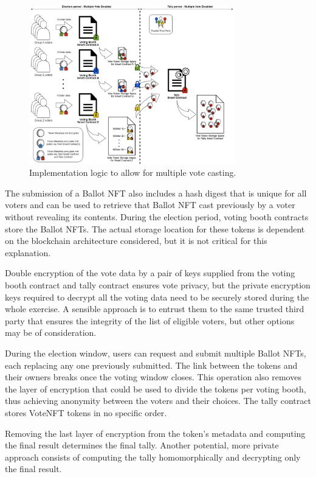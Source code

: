 \documentclass[../main.tex]{subfiles}
\begin{document}
\begin{figure}[htp]
    \centering
    \includegraphics[width=0.8\textwidth]{../Images/MultipleVoteCastingLogic.png}
    \caption{Implementation logic to allow for multiple vote casting.}
    \label{fig:multiple_vote_casting}
\end{figure}


The submission of a Ballot NFT also includes a hash digest that is unique for all voters and can be used to retrieve that Ballot NFT cast previously by a voter without revealing its contents. During the election period, voting booth contracts store the Ballot NFTs. The actual storage location for these tokens is dependent on the blockchain architecture considered, but it is not critical for this explanation.
\par
Double encryption of the vote data by a pair of keys supplied from the voting booth contract and tally contract ensures vote privacy, but the private encryption keys required to decrypt all the voting data need to be securely stored during the whole exercise. A sensible approach is to entrust them to the same trusted third party that ensures the integrity of the list of eligible voters, but other options may be of consideration.
\par
During the election window, users can request and submit multiple Ballot NFTs, each replacing any one previously submitted. The link between the tokens and their owners breaks once the voting window closes. This operation also removes the layer of encryption that could be used to divide the tokens per voting booth, thus achieving anonymity between the voters and their choices. The tally contract stores VoteNFT tokens in no specific order.
\par
Removing the last layer of encryption from the token's metadata and computing the final result determines the final tally. Another potential, more private approach consists of computing the tally homomorphically and decrypting only the final result.
\end{document}
